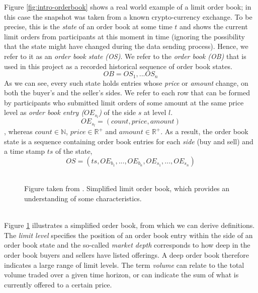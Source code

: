 Figure \ref{fig:intro-orderbook} shows a real world example of a limit order book; in this case the snapshot was taken from a known crypto-currency exchange.
To be precise, this is the \textit{state} of an order book at some time $t$ and shows the current limit orders from participants at this moment in time (ignoring the possibility that the state might have changed during the data sending process). 
Hence, we refer to it as an \textit{order book state (OS)}.
We refer to the \textit{order book (OB)} that is used in this project as a recorded historical sequence of order book states.
\begin{equation}\label{eq:order-book}
OB=OS_1, ... OS_n
\end{equation}
As we can see, every such state holds entries whose \textit{price} or \textit{amount} change, on both the buyer's and the seller's sides.
We refer to each row that can be formed by participants who submitted limit orders of some amount at the same price level as \textit{order book entry ($OE_{s_l}$)} of the side $s$ at level $l$.
\begin{equation}\label{eq:order-book-entry}
OE_{s_l}=(count, price, amount)
\end{equation}
, whereas $count \in \mathbb{N}$, $price \in \mathbb{R^+}$ and $amount \in \mathbb{R^+}$.
As a result, the order book state is a sequence containing order book entries for each \textit{side} (buy and sell) and a time stamp $ts$ of the state,
\begin{equation}\label{eq:order-book-state}
OS=(ts, OE_{b_1}, ..., OE_{b_n}, OE_{s_1}, ..., OE_{s_n})
\end{equation}
\\
\begin{figure}[H]
    \centering
    \caption{Figure taken from \cite{miranda}. Simplified limit order book, which provides an understanding of some characteristics.}
    \label{fig:orderbook-simple}
\end{figure}
\hfill
\\
Figure \ref{fig:orderbook-simple} illustrates a simplified order book, from which we can derive definitions.
The \textit{limit level} specifies the position of an order book entry within the side of an order book state and the so-called \textit{market depth} corresponds to how deep in the order book buyers and sellers have listed offerings.
A deep order book therefore indicates a large range of limit levels.
The term \textit{volume} can relate to the total volume traded over a given time horizon, or can indicate the sum of what is currently offered to a certain price.
